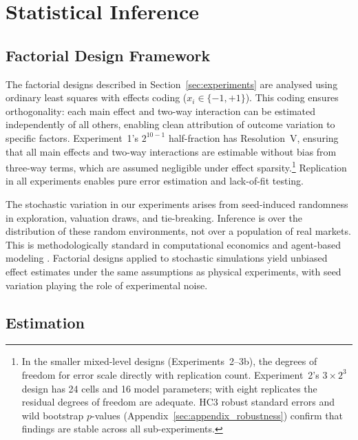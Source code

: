 \section{Statistical Inference}
\label{sec:inference}

\subsection{Factorial Design Framework}

The factorial designs described in Section~\ref{sec:experiments} are analysed using ordinary least squares with effects coding ($x_i \in \{-1, +1\}$). This coding ensures orthogonality: each main effect and two-way interaction can be estimated independently of all others, enabling clean attribution of outcome variation to specific factors. Experiment~1's $2^{10-1}$ half-fraction has Resolution~V, ensuring that all main effects and two-way interactions are estimable without bias from three-way terms, which are assumed negligible under effect sparsity.\footnote{In the smaller mixed-level designs (Experiments~2--3b), the degrees of freedom for error scale directly with replication count. Experiment~2's $3 \times 2^3$ design has 24 cells and 16 model parameters; with eight replicates the residual degrees of freedom are adequate. HC3 robust standard errors and wild bootstrap $p$-values (Appendix~\ref{sec:appendix_robustness}) confirm that findings are stable across all sub-experiments.} Replication in all experiments enables pure error estimation and lack-of-fit testing.

The stochastic variation in our experiments arises from seed-induced randomness in exploration, valuation draws, and tie-breaking. Inference is over the distribution of these random environments, not over a population of real markets. This is methodologically standard in computational economics and agent-based modeling \citep{Tesfatsion2006}. Factorial designs applied to stochastic simulations yield unbiased effect estimates under the same assumptions as physical experiments, with seed variation playing the role of experimental noise.

\subsection{Estimation}

